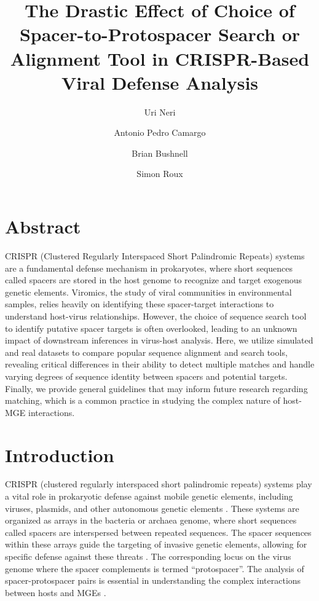\documentclass[
]{article}
\title{The Drastic Effect of Choice of Spacer-to-Protospacer Search or
Alignment Tool in CRISPR-Based Viral Defense Analysis}
\author{Uri Neri \and Antonio Pedro Camargo \and Brian
Bushnell \and Simon Roux}
\date{}
\begin{document}
\maketitle


\section{Abstract}\label{sec-abstract}

CRISPR (Clustered Regularly Interspaced Short Palindromic Repeats)
systems are a fundamental defense mechanism in prokaryotes, where short
sequences called spacers are stored in the host genome to recognize and
target exogenous genetic elements. Viromics, the study of viral
communities in environmental samples, relies heavily on identifying
these spacer-target interactions to understand host-virus relationships.
However, the choice of sequence search tool to identify putative spacer
targets is often overlooked, leading to an unknown impact of downstream
inferences in virus-host analysis. Here, we utilize simulated and real
datasets to compare popular sequence alignment and search tools,
revealing critical differences in their ability to detect multiple
matches and handle varying degrees of sequence identity between spacers
and potential targets. Finally, we provide general guidelines that may
inform future research regarding matching, which is a common practice in
studying the complex nature of host-MGE interactions.

\section{Introduction}\label{sec-introduction}

CRISPR (clustered regularly interspaced short palindromic repeats)
systems play a vital role in prokaryotic defense against mobile genetic
elements, including viruses, plasmids, and other autonomous genetic
elements \autocite{Mojica_2005,CRISPR_review}. These systems are
organized as arrays in the bacteria or archaea genome, where short
sequences called spacers are interspersed between repeated sequences.
The spacer sequences within these arrays guide the targeting of invasive
genetic elements, allowing for specific defense against these threats
\autocite{CRISPR_classification}. The corresponding locus on the virus
genome where the spacer complements is termed ``protospacer''. The
analysis of spacer-protospacer pairs is essential in understanding the
complex interactions between hosts and MGEs
\autocite{Edwards2015_phage_host}.
\end{document}
